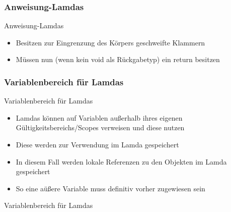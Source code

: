 \subsubsection{Anweisung-Lamdas}
\begin{frame}{Anweisung-Lamdas}
	\begin{itemize}
		\item Besitzen zur Eingrenzung des Körpers geschweifte Klammern
		\item Müssen nun (wenn kein \alert{void} als Rückgabetyp) ein \alert{return} besitzen	
	\end{itemize}
	
	
\end{frame}

\subsubsection{Variablenbereich für Lamdas}
\begin{frame}{Variablenbereich für Lamdas}
	\begin{itemize}
		\item Lamdas können auf Variablen außerhalb ihres eigenen Gültigkeitsbereichs/Scopes verweisen und diese nutzen
		\item Diese werden zur Verwendung im Lamda gespeichert
		\item In diesem Fall werden lokale Referenzen zu den Objekten im Lamda gespeichert
		\item So eine aüßere Variable muss definitiv vorher zugewiesen sein
	\end{itemize}
	
\end{frame}

\begin{frame}{Variablenbereich für Lamdas}
	
\end{frame}


